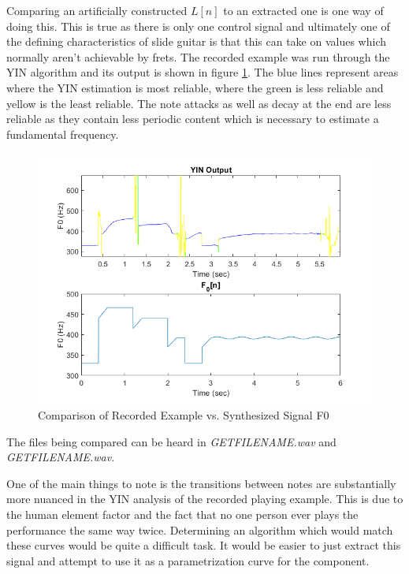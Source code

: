 \documentclass[../main.tex]{subfiles}
\begin{document}
Comparing an artificially constructed $L[n]$ to an extracted one is one way of doing this. This is true as there is only one control signal and ultimately one of the defining characteristics of slide guitar is that this can take on values which normally aren't achievable by frets. The recorded example was run through the YIN algorithm and its output is shown in figure \ref{fig:YINOutput}. The blue lines represent areas where the YIN estimation is most reliable, where the green is less reliable and yellow is the least reliable. The note attacks as well as decay at the end are less reliable as they contain less periodic content which is necessary to estimate a fundamental frequency.

\begin{figure}[h]
    \centering
    \includegraphics[scale=.65]{./images/plots/F0Compare.png}
    \caption{Comparison of Recorded Example vs. Synthesized Signal F0}
    \label{fig:YINOutput}
\end{figure}

The files being compared can be heard in \emph{GETFILENAME.wav} and \emph{GETFILENAME.wav}.

One of the main things to note is the transitions between notes are substantially more nuanced in the YIN analysis of the recorded playing example. This is due to the human element factor and the fact that no one person ever plays the performance the same way twice. Determining an algorithm which would match these curves would be quite a difficult task. It would be easier to just extract this signal and attempt to use it as a parametrization curve for the component.
\end{document}
